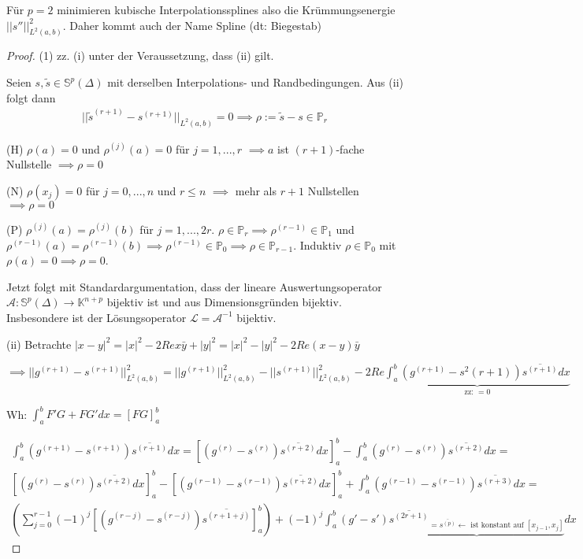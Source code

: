 \begin{remark}
	Für $p=2$ minimieren kubische Interpolationssplines also die Krümmungsenergie $||s''||_{L^2(a,b)}^2$. Daher kommt auch der Name Spline (dt: Biegestab)
\end{remark}

\begin{proof}
	(1) zz. (i) unter der Veraussetzung, dass (ii) gilt.
	
	Seien $s, \tilde{s} \in \mathbb{S}^p(\Delta)$ mit derselben Interpolations- und Randbedingungen. Aus (ii) folgt dann
	\begin{align*}
		||\tilde{s}^{(r+1)} - s^{(r+1)}||_{L^2(a,b)} = 0 \implies \rho := \tilde{s} - s \in \mathbb{P}_r
	\end{align*}
	
	(H) $\rho(a) = 0$ und $\rho^{(j)}(a) = 0$ für $j=1, ..., r$ $\implies a$ ist $(r+1)$-fache Nullstelle $\implies \rho = 0$
	
	(N) $\rho(x_j) = 0$ für $j=0, ..., n$ und $r \leq n$ $\implies$ mehr als $r+1$ Nullstellen $\implies \rho = 0$
	
	(P) $\rho^{(j)}(a) = \rho^{(j)}(b)$ für $j = 1, ..., 2r$. $\rho \in \mathbb{P}_r \implies \rho^{(r-1)} \in \mathbb{P}_1$ und $\rho^{(r-1)}(a) = \rho^{(r-1)}(b) \implies \rho^{(r-1)} \in \mathbb{P}_0 \implies \rho \in \mathbb{P}_{r-1}$. Induktiv $\rho \in \mathbb{P}_0$ mit $\rho(a) = 0 \implies \rho = 0$.
	
	Jetzt folgt mit Standardargumentation, dass der lineare Auswertungsoperator $\mathcal{A}: \mathbb{S}^p(\Delta) \rightarrow \mathbb{K}^{n+p}$ bijektiv ist und aus Dimensionsgründen bijektiv. Insbesondere ist der Lösungsoperator $\mathcal{L} = \mathcal{A}^{-1}$ bijektiv.
	
	(ii) Betrachte $|x-y|^2 = |x|^2 - 2 Re x \bar{y} + |y|^2 = |x|^2 - |y|^2 - 2 Re (x-y)\bar{y}$
	
	$\implies ||g^{(r+1)} - s^{(r+1)}||_{L^2(a,b)}^2 = ||g^{(r+1)}||_{L^2(a,b)}^2 - ||s^{(r+1)}||_{L^2(a,b)}^2 - 2 Re \underbrace{\int_{a}^{b} (g^{(r+1)} - s^2{(r+1)}) \overline{s^{(r+1)}} dx}_{\text{zz: }=0}$
	
	Wh: $\int_{a}^{b}F'G + FG' dx = [FG]_a^b$
	
	\begin{align*}
		\int_{a}^{b} (g^{(r+1)} - s^{(r+1)}) \overline{s^{(r+1)}} dx = \left[(g^{(r)} - s^{(r)}) \overline{s^{(r+2)}} dx \right]_a^b - \int_{a}^{b} (g^{(r)} - s^{(r)}) \overline{s^{(r+2)}} dx =\\
		\left[(g^{(r)} - s^{(r)}) \overline{s^{(r+2)}} dx \right]_a^b - \left[(g^{(r-1)} - s^{(r-1)}) \overline{s^{(r+2)}} dx \right]_a^b + \int_{a}^{b} (g^{(r-1)} - s^{(r-1)}) \overline{s^{(r+3)}} dx =\\
		\left(\sum_{j=0}^{r-1} (-1)^j \left[(g^{(r-j)} - s^{(r-j)}) \overline{s^{(r+1+j)}}\right]_a^b \right) + (-1)^j \int_{a}^{b} (g' - s') \underbrace{\overline{s^{(2r+1)}}_{=\overline{s^(p)} \leftarrow \text{ ist konstant auf }[x_{j-1}, x_j]}} dx
	\end{align*}
	

\end{proof}
